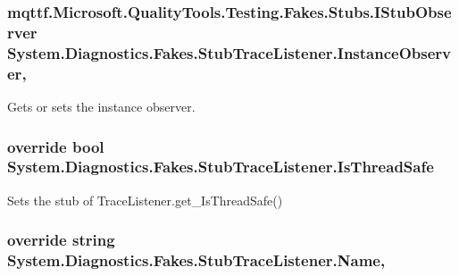 \hypertarget{class_system_1_1_diagnostics_1_1_fakes_1_1_stub_trace_listener_afe9a55f3fba5186d32377a0f466adf9f}{
\subsubsection[{Instance\-Observer}]{\setlength{\rightskip}{0pt plus 5cm}mqttf.\-Microsoft.\-Quality\-Tools.\-Testing.\-Fakes.\-Stubs.\-I\-Stub\-Observer System.\-Diagnostics.\-Fakes.\-Stub\-Trace\-Listener.\-Instance\-Observer\hspace{0.3cm}{\ttfamily [get]}, {\ttfamily [set]}}}\label{class_system_1_1_diagnostics_1_1_fakes_1_1_stub_trace_listener_afe9a55f3fba5186d32377a0f466adf9f}


Gets or sets the instance observer.

\hypertarget{class_system_1_1_diagnostics_1_1_fakes_1_1_stub_trace_listener_a631ec010f5c49b00e214104bd8578c03}{
\subsubsection[{Is\-Thread\-Safe}]{\setlength{\rightskip}{0pt plus 5cm}override bool System.\-Diagnostics.\-Fakes.\-Stub\-Trace\-Listener.\-Is\-Thread\-Safe\hspace{0.3cm}{\ttfamily [get]}}}\label{class_system_1_1_diagnostics_1_1_fakes_1_1_stub_trace_listener_a631ec010f5c49b00e214104bd8578c03}


Sets the stub of Trace\-Listener.\-get\-\_\-\-Is\-Thread\-Safe()

\hypertarget{class_system_1_1_diagnostics_1_1_fakes_1_1_stub_trace_listener_ad952ee7da14ca97695bc2d8ede29fc2e}{
\subsubsection[{Name}]{\setlength{\rightskip}{0pt plus 5cm}override string System.\-Diagnostics.\-Fakes.\-Stub\-Trace\-Listener.\-Name\hspace{0.3cm}{\ttfamily [get]}, {\ttfamily [set]}}}\label{class_system_1_1_diagnostics_1_1_fakes_1_1_stub_trace_listener_ad952ee7da14ca97695bc2d8ede29fc2e}



